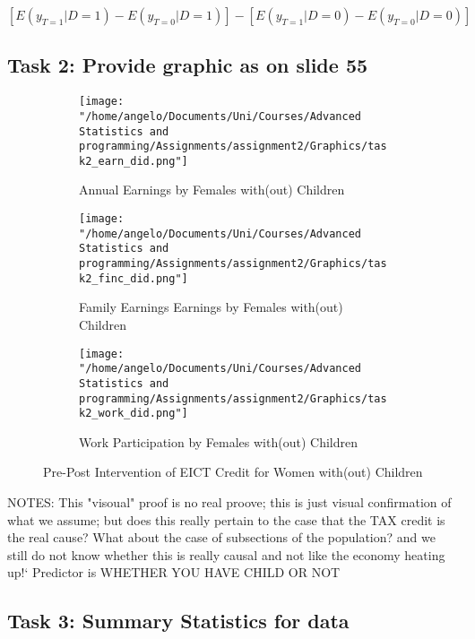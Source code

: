 \documentclass[a4paper]{article}
\begin{document}
$
[E(y_{T=1} | D=1) - E(y_{T=0} | D=1)] - [E(y_{T=1} | D=0) - E(y_{T=0} | D=0)]
$




\subsection{Task 2: Provide graphic as on slide 55}


\begin{wrapfigure}{L}{9cm}
\centering
\begin{subfigure}[b]{0.5\textwidth}
    \texttt{[image: "/home/angelo/Documents/Uni/Courses/Advanced Statistics and programming/Assignments/assignment2/Graphics/task2\_earn\_did.png"]} 
   \caption{Annual Earnings by Females with(out) Children}
   \label{fig:Ng2}
\end{subfigure}

\begin{subfigure}[b]{0.5\textwidth}
    \texttt{[image: "/home/angelo/Documents/Uni/Courses/Advanced Statistics and programming/Assignments/assignment2/Graphics/task2\_finc\_did.png"]} 
   \caption{Family Earnings Earnings by Females with(out) Children}
   \label{fig:Ng2}
\end{subfigure}

\begin{subfigure}[b]{0.5\textwidth}
    \texttt{[image: "/home/angelo/Documents/Uni/Courses/Advanced Statistics and programming/Assignments/assignment2/Graphics/task2\_work\_did.png"]}  
   \caption{Work Participation by Females with(out) Children}
   \label{fig:Ng2}
\end{subfigure}
\captionsetup{justification=centering}
\caption{Pre-Post Intervention of EICT Credit for Women with(out) Children}
\end{wrapfigure}





NOTES: This "visoual" proof is no real proove; this is just visual confirmation of what we assume; but does this really pertain to the case that the TAX credit is the real cause? What about the case of subsections of the population? and we still do not know whether this is really causal and not like the economy heating up!`
Predictor is WHETHER YOU HAVE CHILD OR NOT


\subsection{Task 3: Summary Statistics for data}
\end{document}
